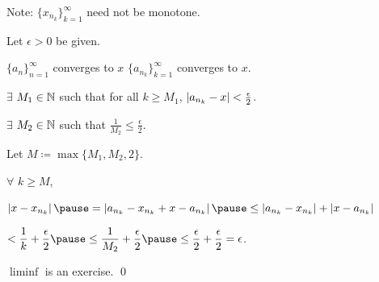 \documentclass[10pt,aspectratio=169]{beamer}
\begin{document}
\begin{frame}

Note: $\{ x_{n_k} \}_{k=1}^\infty$ need not be monotone.

\pause
\medskip

Let $\epsilon > 0$ be given.

\pause
\medskip

$\{ a_n \}_{n=1}^\infty$ converges to $x$ \wthus $\{ a_{n_k} \}_{k=1}^\infty$ converges to $x$.

\pause
\medskip

$\exists$ $M_1 \in {\mathbb{N}}$ such that for all $k \geq M_1$, \quad
$\left\lvert {a_{n_k} - x} \right\rvert < \frac{\epsilon}{2}$.

\pause
\medskip

$\exists$ $M_2 \in {\mathbb{N}}$ such that
\quad $\displaystyle \frac{1}{M_2} \leq \frac{\epsilon}{2}$.

\pause
\medskip

Let $M \coloneqq \max \{M_1 , M_2 , 2 \}$.

\pause
\medskip

$\forall$ $k \geq M$,

\medskip

$\displaystyle
\abs{x- x_{n_k}}
\pause
=
\abs{a_{n_k} - x_{n_k} + x - a_{n_k}}
\pause
\leq
\abs{a_{n_k} - x_{n_k}} + \abs{x - a_{n_k}}$

\pause
\medskip

\qquad
$\displaystyle
< \frac{1}{k} + \frac{\epsilon}{2}
\pause
\leq \frac{1}{M_2} + \frac{\epsilon}{2}
\pause
\leq \frac{\epsilon}{2} +
\frac{\epsilon}{2} = \epsilon$.

\pause
\medskip

$\liminf$ is an exercise.
\qed

\end{frame}
\end{document}

